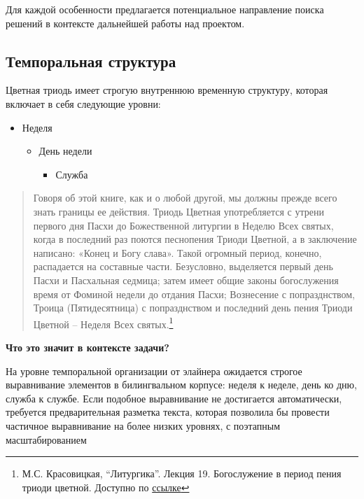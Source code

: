 \documentclass[
  letterpaper,
]{book}
\providecommand{\tightlist}{%
  \setlength{\itemsep}{0pt}\setlength{\parskip}{0pt}}\usepackage{longtable,booktabs,array}
\begin{document}
Для каждой особенности предлагается потенциальное направление поиска
решений в контексте дальнейшей работы над проектом.

\hypertarget{sec-temporal_structure}{%
\subsection{Темпоральная структура}\label{sec-temporal_structure}}

Цветная триодь имеет строгую внутреннюю временную структуру, которая
включает в себя следующие уровни:

\begin{itemize}
\item
  Неделя

  \begin{itemize}
  \item
    День недели

    \begin{itemize}
    \tightlist
    \item
      Служба
    \end{itemize}
  \end{itemize}
\end{itemize}

\begin{quote}
Говоря об этой книге, как и о любой другой, мы должны прежде всего знать
границы ее действия. Триодь Цветная употребляется с утрени первого дня
Пасхи до Божественной литургии в Неделю Всех святых, когда в последний
раз поются песнопения Триоди Цветной, а в заключение написано: «Конец и
Богу слава». Такой огромный период, конечно, распадается на составные
части. Безусловно, выделяется первый день Пасхи и Пасхальная седмица;
затем имеет общие законы богослужения время от Фоминой недели до отдания
Пасхи; Вознесение с попразднством, Троица (Пятидесятница) с
попразднством и последний день пения Триоди Цветной -- Неделя Всех
святых.\footnote{М.С. Красовицкая, ``Литургика''. Лекция 19.
  Богослужение в период пения триоди цветной. Доступно по
  \href{https://azbyka.ru/otechnik/Pravoslavnoe_Bogosluzhenie/liturgika-krasovitskaja/19}{ссылке}}
\end{quote}

\begin{tcolorbox}[enhanced jigsaw, toprule=.15mm, colframe=quarto-callout-note-color-frame, colback=white, left=2mm, arc=.35mm, leftrule=.75mm, bottomrule=.15mm, rightrule=.15mm, opacityback=0, breakable]

\textbf{Что это значит в контексте задачи?}\vspace{2mm}

На уровне темпоральной организации от элайнера ожидается строгое
выравнивание элементов в билингвальном корпусе: неделя к неделе, день ко
дню, служба к службе. Если подобное выравнивание не достигается
автоматически\footnotemark{}, требуется предварительная разметка текста,
которая позволила бы провести частичное выравнивание на более низких
уровнях, с поэтапным масштабированием

\end{tcolorbox}
\end{document}
